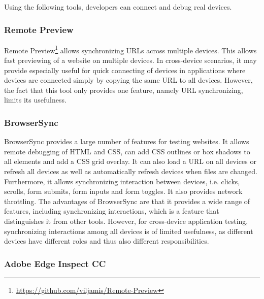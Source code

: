 Using the following tools, developers can connect and debug real devices. 

\subsubsection{Remote Preview}

Remote Preview\footnote{\url{https://github.com/viljamis/Remote-Preview}} allows synchronizing URLs across multiple devices. This allows fast previewing of a website on multiple devices. In cross-device scenarios, it may provide especially useful for quick connecting of devices in applications where devices are connected simply by copying the same URL to all devices. However, the fact that this tool only provides one feature, namely URL synchronizing, limits its usefulness.

\subsubsection{BrowserSync}

BrowserSync provides a large number of features for testing websites. It allows remote debugging of HTML and CSS, can add CSS outlines or box shadows to all elements and add a CSS grid overlay. It can also load a URL on all devices or refresh all devices as well as automatically refresh devices when files are changed. Furthermore, it allows synchronizing interaction between devices, i.e. clicks, scrolls, form submits, form inputs and form toggles. It also provides network throttling. The advantages of BrowserSync are that it provides a wide range of features, including synchronizing interactions, which is a feature that distinguishes it from other tools. However, for cross-device application testing, synchronizing interactions among all devices is of limited usefulness, as different devices have different roles and thus also different responsibilities.

\subsubsection{Adobe Edge Inspect CC}

